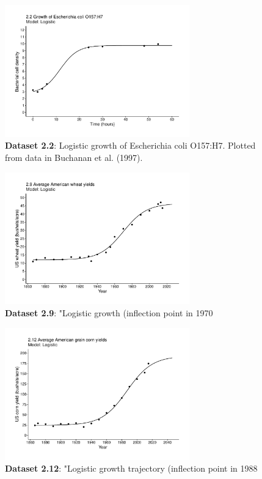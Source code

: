 \documentclass[aps,rmp,preprint,superscriptaddress,10pt,onecolumn]{article}
\begin{document}
\begin{figure}[h]
\includegraphics[width=8cm]{output/figs-ggplot/2.2.pdf}
\caption{\textbf{Dataset 2.2}: Logistic growth of Escherichia coli O157:H7. Plotted from data in Buchanan et al. (1997).}
\end{figure}
	
\begin{figure}[h]
\includegraphics[width=8cm]{output/figs-ggplot/2.9.pdf}
\caption{\textbf{Dataset 2.9}: "Logistic growth (inflection point in 1970}
\end{figure}
	
\begin{figure}[h]
\includegraphics[width=8cm]{output/figs-ggplot/2.12.pdf}
\caption{\textbf{Dataset 2.12}: "Logistic growth trajectory (inflection point in 1988}
\end{figure}
	
\end{document}
